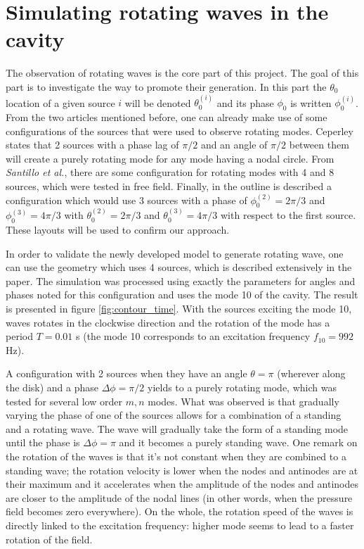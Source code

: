 \documentclass[%
 reprint,
 amsmath,amssymb,
 aps,
]{revtex4-2}
\begin{document}
\section{Simulating rotating waves in the cavity}
The observation of rotating waves is the core part of this project. The goal of this part is to investigate the way to promote their generation. In this part the $\theta_0$ location of a given source $i$ will be denoted $\theta_0^{(i)}$ and its phase $\phi_0$ is written $\phi_0^{(i)}$. From the two articles mentioned before, one can already make use of some configurations of the sources that were used to observe rotating modes. Ceperley states \cite{ceperley2002, ceperley1995} that 2 sources with a phase lag of $\pi/2$ and an angle of $\pi/2$ between them will create a purely rotating mode for any mode having a nodal circle. From \emph{Santillo et al.}, there are some configuration for rotating modes with 4 and 8 sources, which were tested in free field. Finally, in the outline is described a configuration which would use 3 sources with a phase of $\phi_0^{(2)} = 2\pi/3$ and $\phi_0^{(3)} = 4\pi/3$ with $\theta_0^{(2)} = 2\pi/3$ and $\theta_0^{(3)} = 4\pi/3$ with respect to the first source. These layouts will be used to confirm our approach.

In order to validate the newly developed model to generate rotating wave, one can use the geometry which uses 4 sources, which is described extensively in the paper. The simulation was processed using exactly the parameters for angles and phases noted for this configuration and uses the mode 10 of the cavity. The result is presented in figure \ref{fig:contour_time}. With the sources exciting the mode 10, waves rotates in the clockwise direction and the rotation of the mode has a period $T = 0.01$ s (the mode 10 corresponds to an excitation frequency $f_{10} = 992$ Hz).

A configuration with 2 sources when they have an angle $\theta = \pi$ (wherever along the disk) and a phase $\Delta \phi = \pi/2$ yields to a purely rotating mode, which was tested for several low order $m,n$ modes. What was observed is that gradually varying the phase of one of the sources allows for a combination of a standing and a rotating wave. The wave will gradually take the form of a standing mode until the phase is $\Delta \phi = \pi$ and it becomes a purely standing wave. One remark on the rotation of the waves is that it's not constant when they are combined to a standing wave; the rotation velocity is lower when the nodes and antinodes are at their maximum and it accelerates when the amplitude of the nodes and antinodes are closer to the amplitude of the nodal lines (in other words, when the pressure field becomes zero everywhere). On the whole, the rotation speed of the waves is directly linked to the excitation frequency: higher mode seems to lead to a faster rotation of the field.
\end{document}
